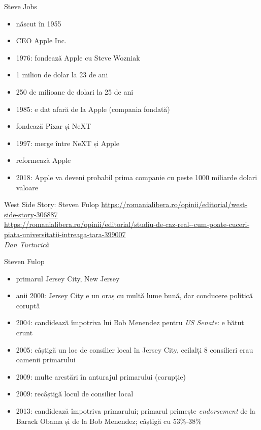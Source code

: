 \documentclass[handout]{beamer}
\begin{document}
\begin{frame}{Steve Jobs}
  \begin{itemize}
    \pause \item născut în 1955
    \pause \item CEO Apple Inc.
    \pause \item 1976: fondează Apple cu Steve Wozniak
    \pause \item 1 milion de dolar la 23 de ani
    \pause \item 250 de milioane de dolari la 25 de ani
    \pause \item 1985: e dat afară de la Apple (compania fondată)
    \pause \item fondează Pixar și NeXT
    \pause \item 1997: merge între NeXT și Apple
    \pause \item reformează Apple
    \pause \item 2018: Apple va deveni probabil prima companie cu peste 1000 miliarde dolari valoare
  \end{itemize}
\end{frame}

\begin{frame}{West Side Story: Steven Fulop}
  \pause
  \tiny{\url{https://romanialibera.ro/opinii/editorial/west-side-story-306887}}\\
  \tiny{\url{https://romanialibera.ro/opinii/editorial/studiu-de-caz-real--cum-poate-cuceri-piata-universitatii-intreaga-tara-399007}}\\
  \vspace{3mm}
  \normalsize{\hfill \textit{Dan Turturică}}
\end{frame}

\begin{frame}{Steven Fulop}
  \begin{itemize}
    \pause \item primarul Jersey City, New Jersey
    \pause \item anii 2000: Jersey City e un oraș cu multă lume bună, dar conducere politică coruptă
    \pause \item 2004: candidează împotriva lui Bob Menendez pentru \textit{US Senate}: e bătut crunt
    \pause \item 2005: câștigă un loc de consilier local în Jersey City, ceilalți 8 consilieri erau oamenii primarului
    \pause \item 2009: multe arestări în anturajul primarului (corupție)
    \pause \item 2009: recâștigă locul de consilier local
    \pause \item 2013: candidează împotriva primarului; primarul primește \textit{endorsement} de la Barack Obama și de la Bob Menendez; câștigă cu 53\%-38\%
  \end{itemize}
\end{frame}
\end{document}
